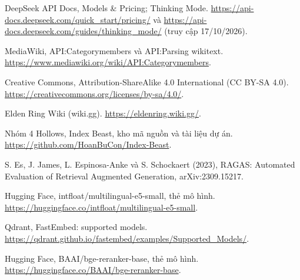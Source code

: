 {\noindent [10] DeepSeek API Docs, Models \& Pricing; Thinking Mode. \url{https://api-docs.deepseek.com/quick_start/pricing/} và \url{https://api-docs.deepseek.com/guides/thinking_mode/} (truy cập 17/10/2026).\par}\vspace{6pt}

{\noindent [11] MediaWiki, API:Categorymembers và API:Parsing wikitext. \url{https://www.mediawiki.org/wiki/API:Categorymembers}.\par}\vspace{6pt}

{\noindent [12] Creative Commons, Attribution-ShareAlike 4.0 International (CC BY-SA 4.0). \url{https://creativecommons.org/licenses/by-sa/4.0/}.\par}\vspace{6pt}

{\noindent [13] Elden Ring Wiki (wiki.gg). \url{https://eldenring.wiki.gg/}.\par}\vspace{6pt}

{\noindent [14] Nhóm 4 Hollows, Index Beast, kho mã nguồn và tài liệu dự án. \url{https://github.com/HoanBuCon/Index-Beast}.\par}\vspace{6pt}

{\noindent [15] S. Es, J. James, L. Espinosa-Anke và S. Schockaert (2023), RAGAS: Automated Evaluation of Retrieval Augmented Generation, arXiv:2309.15217.\par}\vspace{6pt}

{\noindent [16] Hugging Face, intfloat/multilingual-e5-small, thẻ mô hình. \url{https://huggingface.co/intfloat/multilingual-e5-small}.\par}\vspace{6pt}

{\noindent [17] Qdrant, FastEmbed: supported models. \url{https://qdrant.github.io/fastembed/examples/Supported_Models/}.\par}\vspace{6pt}

{\noindent [18] Hugging Face, BAAI/bge-reranker-base, thẻ mô hình. \url{https://huggingface.co/BAAI/bge-reranker-base}.\par}\vspace{6pt}
